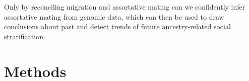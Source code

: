 \documentclass[11pt]{article}
\begin{document}
Only by reconciling migration and assortative mating can we confidently infer assortative mating from genomic data, which can then be used to draw conclusions about past and detect trends of future ancestry-related social stratification.









\vspace{8mm}
\section{Methods}



\end{document}

